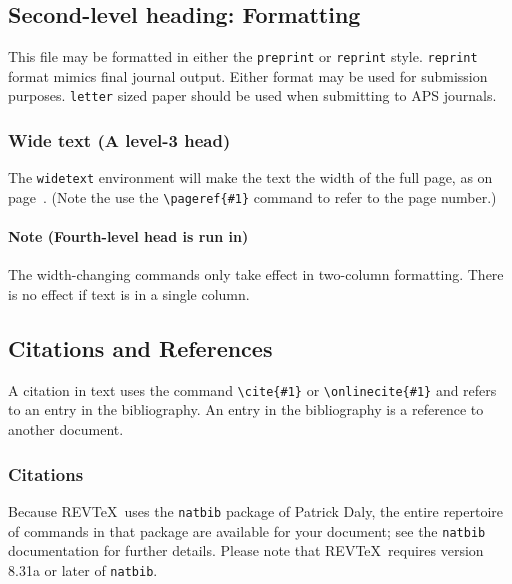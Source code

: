 \documentclass[%
 reprint,
 amsmath,amssymb,
 aps,
]{revtex4-1}
\begin{document}
\subsection{\label{sec:level2}Second-level heading: Formatting}

This file may be formatted in either the \texttt{preprint} or
\texttt{reprint} style. \texttt{reprint} format mimics final journal output. 
Either format may be used for submission purposes. \texttt{letter} sized paper should
be used when submitting to APS journals.

\subsubsection{Wide text (A level-3 head)}
The \texttt{widetext} environment will make the text the width of the
full page, as on page~\pageref{eq:wideeq}. (Note the use the
\verb+\pageref{#1}+ command to refer to the page number.) 
\paragraph{Note (Fourth-level head is run in)}
The width-changing commands only take effect in two-column formatting. 
There is no effect if text is in a single column.

\subsection{\label{sec:citeref}Citations and References}
A citation in text uses the command \verb+\cite{#1}+ or
\verb+\onlinecite{#1}+ and refers to an entry in the bibliography. 
An entry in the bibliography is a reference to another document.

\subsubsection{Citations}
Because REV\TeX\ uses the \verb+natbib+ package of Patrick Daly, 
the entire repertoire of commands in that package are available for your document;
see the \verb+natbib+ documentation for further details. Please note that
REV\TeX\ requires version 8.31a or later of \verb+natbib+.
\end{document}
